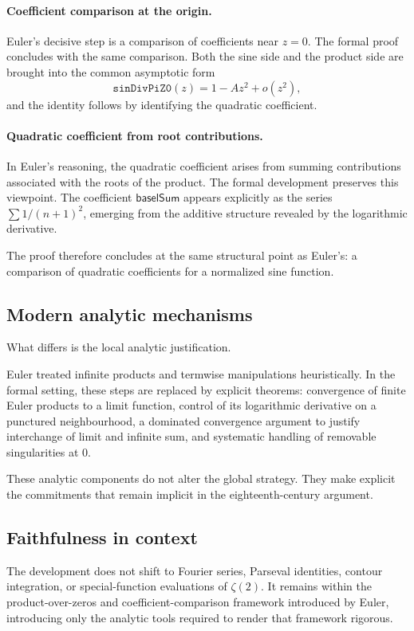 \documentclass[11pt,a4paper]{article}
\theoremstyle{plain}
\theoremstyle{definition}
\DeclareRobustCommand{\leanid}[1]{\texttt{#1}}
\newcommand{\baselSum}{\ensuremath{\mathsf{baselSum}}}
\newcommand{\sinDivPiZZero}{\leanid{sinDivPiZ0}}
\begin{document}
\paragraph{Coefficient comparison at the origin.}
Euler’s decisive step is a comparison of coefficients near \(z=0\). The formal proof concludes with the same comparison. Both the sine side and the product side are brought into the common asymptotic form
\[
\sinDivPiZZero(z)
=
1 - A z^{2} + o(z^{2}),
\]
and the identity follows by identifying the quadratic coefficient.

\paragraph{Quadratic coefficient from root contributions.}
In Euler’s reasoning, the quadratic coefficient arises from summing contributions associated with the roots of the product. The formal development preserves this viewpoint. The coefficient \baselSum{} appears explicitly as the series \(\sum 1/(n+1)^{2}\), emerging from the additive structure revealed by the logarithmic derivative.

The proof therefore concludes at the same structural point as Euler’s: a comparison of quadratic coefficients for a normalized sine function.

\subsection{Modern analytic mechanisms}

What differs is the local analytic justification.

Euler treated infinite products and termwise manipulations heuristically. In the formal setting, these steps are replaced by explicit theorems: convergence of finite Euler products to a limit function, control of its logarithmic derivative on a punctured neighbourhood, a dominated convergence argument to justify interchange of limit and infinite sum, and systematic handling of removable singularities at \(0\).

These analytic components do not alter the global strategy. They make explicit the commitments that remain implicit in the eighteenth-century argument.

\subsection{Faithfulness in context}

The development does not shift to Fourier series, Parseval identities, contour integration, or special-function evaluations of \(\zeta(2)\). It remains within the product-over-zeros and coefficient-comparison framework introduced by Euler, introducing only the analytic tools required to render that framework rigorous.
\end{document}
